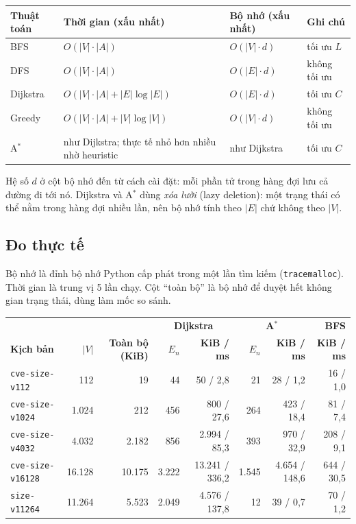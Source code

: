 \documentclass[11pt,a4paper]{article}
\begin{document}
\begin{center}
\small
\begin{tabular}{@{}lY{4.4cm}Y{4.2cm}Y{4.6cm}@{}}
\toprule
\textbf{Thuật toán} & \textbf{Thời gian (xấu nhất)} & \textbf{Bộ nhớ (xấu nhất)} & \textbf{Ghi chú} \\
\midrule
BFS & $O(|V|\cdot|A|)$ & $O(|V| \cdot d)$ & tối ưu $L$ \\
DFS & $O(|V|\cdot|A|)$ & $O(|E| \cdot d)$ & không tối ưu \\
Dijkstra & $O(|V|\cdot|A| + |E|\log|E|)$ & $O(|E| \cdot d)$ & tối ưu $C$ \\
Greedy & $O(|V|\cdot|A| + |V|\log|V|)$ & $O(|V| \cdot d)$ & không tối ưu \\
A$^{*}$ & như Dijkstra; thực tế nhỏ hơn nhiều nhờ heuristic & như Dijkstra & tối ưu $C$ \\
\bottomrule
\end{tabular}
\end{center}

Hệ số $d$ ở cột bộ nhớ đến từ cách cài đặt: mỗi phần tử trong hàng đợi lưu cả đường đi tới nó. Dijkstra và A$^{*}$ dùng \emph{xóa lười} (lazy deletion): một trạng thái có thể nằm trong hàng đợi nhiều lần, nên bộ nhớ tính theo $|E|$ chứ không theo $|V|$.

\subsection{Đo thực tế}

Bộ nhớ là đỉnh bộ nhớ Python cấp phát trong một lần tìm kiếm (\texttt{tracemalloc}). Thời gian là trung vị 5 lần chạy. Cột ``toàn bộ'' là bộ nhớ để duyệt hết không gian trạng thái, dùng làm mốc so sánh.

\begin{center}
\small
\begin{tabular}{@{}lrrrrrrr@{}}
\toprule
 & & & \multicolumn{2}{c}{\textbf{Dijkstra}} & \multicolumn{2}{c}{\textbf{A$^{*}$}} & \textbf{BFS} \\
\cmidrule(lr){4-5}\cmidrule(lr){6-7}\cmidrule(lr){8-8}
\textbf{Kịch bản} & $|V|$ & \textbf{Toàn bộ (KiB)} & $E_n$ & \textbf{KiB / ms} & $E_n$ & \textbf{KiB / ms} & \textbf{KiB / ms} \\
\midrule
\texttt{cve-size-v112}   & 112    & 19     & 44    & 50 / 2,8       & 21    & 28 / 1,2      & 16 / 1,0 \\
\texttt{cve-size-v1024}  & 1.024  & 212    & 456   & 800 / 27,6     & 264   & 423 / 18,4    & 81 / 7,4 \\
\texttt{cve-size-v4032}  & 4.032  & 2.182  & 856   & 2.994 / 85,3   & 393   & 970 / 32,9    & 208 / 9,1 \\
\texttt{cve-size-v16128} & 16.128 & 10.175 & 3.222 & 13.241 / 336,2 & 1.545 & 4.654 / 148,6 & 644 / 30,5 \\
\texttt{size-v11264}     & 11.264 & 5.523  & 2.049 & 4.576 / 137,8  & 12    & 39 / 0,7      & 70 / 1,2 \\
\bottomrule
\end{tabular}
\end{center}
\end{document}
